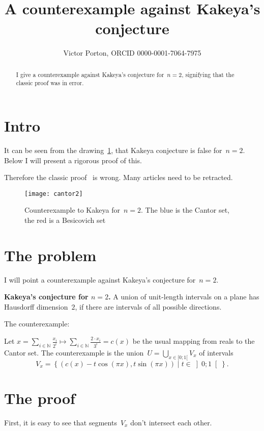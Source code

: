 \documentclass[oneside,draft]{amsart}
\title{A counterexample against Kakeya's conjecture}
\author{Victor Porton, ORCID 0000-0001-7064-7975}
\newcommand{\setcond}[2]{\left\{#1\mid#2\right\}}
\begin{document}
\begin{abstract}
I give a counterexample against Kakeya's conjecture for~$n=2$, signifying that the classic proof was in error.
\end{abstract}

\maketitle  

\section{Intro}

It can be seen from the drawing~\ref{fig:example}, that Kakeya conjecture is false for~$n=2$. Below I will present a rigorous proof of this.

Therefore the classic proof~\cite{kakeya2d} is wrong. Many articles need to be retracted.

\begin{figure}[hbt]
    \centering
    \texttt{[image: cantor2]}
    \caption{Counterexample to Kakeya for~$n=2$. The blue is the Cantor set, the red is a Besicovich set}
    \label{fig:example}
\end{figure}

\section{The problem}

I will point a counterexample against Kakeya's conjecture for~$n=2$.

\textbf{Kakeya's conjecture for $n=2$.} A union of unit-length intervals on a plane has Hausdorff dimension~$2$, if there are intervals of all possible directions.

The counterexample:

Let $x = \sum_{i\in\mathbb{N}} \frac{x_i}{2^i} \mapsto \sum_{i\in\mathbb{N}} \frac{2\cdot x_i}{3^i} = c(x)$ be the usual mapping from reals to the Cantor set.
The counterexample is the union~$U=\bigcup_{x\in[0;1[}V_x$ of intervals \[ V_x = \setcond{(c(x)-t\cos(\pi x), t\sin(\pi x))}{t\in\left]0;1\right[}. \]

\section{The proof}

First, it is easy to see that segments~$V_x$ don't intersect each other.
\end{document}
